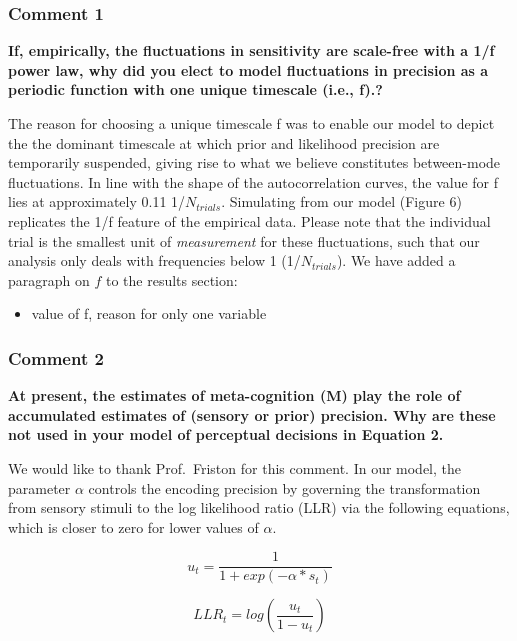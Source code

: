 \documentclass[
]{article}
\providecommand{\tightlist}{%
  \setlength{\itemsep}{0pt}\setlength{\parskip}{0pt}}
\begin{document}
\hypertarget{comment-1}{%
\subsubsection{Comment 1}\label{comment-1}}

\textbf{If, empirically, the fluctuations in sensitivity are scale-free
with a 1/f power law, why did you elect to model fluctuations in
precision as a periodic function with one unique timescale (i.e., f).?}

The reason for choosing a unique timescale f was to enable our model to
depict the the dominant timescale at which prior and likelihood
precision are temporarily suspended, giving rise to what we believe
constitutes between-mode fluctuations. In line with the shape of the
autocorrelation curves, the value for f lies at approximately 0.11
1/\(N_{trials}\). Simulating from our model (Figure 6) replicates the
1/f feature of the empirical data. Please note that the individual trial
is the smallest unit of \emph{measurement} for these fluctuations, such
that our analysis only deals with frequencies below 1
(1/\(N_{trials}\)). We have added a paragraph on \(f\) to the results
section:

\begin{itemize}
\tightlist
\item
  value of f, reason for only one variable
\end{itemize}

\hypertarget{comment-2}{%
\subsubsection{Comment 2}\label{comment-2}}

\textbf{At present, the estimates of meta-cognition (M) play the role of
accumulated estimates of (sensory or prior) precision. Why are these not
used in your model of perceptual decisions in Equation 2.}

We would like to thank Prof.~Friston for this comment. In our model, the
parameter \(\alpha\) controls the encoding precision by governing the
transformation from sensory stimuli to the log likelihood ratio (LLR)
via the following equations, which is closer to zero for lower values of
\(\alpha\).

\begin{equation}
u_t = \frac{1}{1 + exp(-\alpha * s_t)}
\end{equation}

\begin{equation}
LLR_t = log(\frac{u_t}{1-u_t})
\end{equation}
\end{document}
